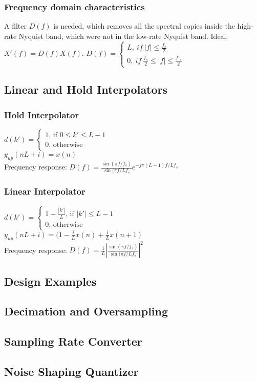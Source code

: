 \subsubsection{Frequency domain characteristics}
A filter $D(f)$ is needed, which removes all the spectral copies inside the high-rate Nyquist band, which were not in the low-rate Nyquist band. Ideal: $X'(f) = D(f)X(f)$.
$D(f)=\begin{cases} L,\ if\ |f|\leq\frac{f_s}{2}\\
0,\ if\ \frac{f_s}{2}\leq |f|\leq\frac{f'_s}{2}
\end{cases}$

\subsection{Linear and Hold Interpolators}
\subsubsection{Hold Interpolator}
$d(k')=\begin{cases}
1\text{, if }0\leq k' \leq L -1\\
0\text{, otherwise}\end{cases}$\\
$y_{up}(nL+i)=x(n)$\\
Frequency response: $D(f)=\frac{\sin(\pi f/f_s)}{\sin(\pi f/Lf_s}e^{-j\pi(L-1)f/Lf_s}$
\subsubsection{Linear Interpolator}
$d(k')=\begin{cases}
1-\frac{|k'|}{L}\text{, if }|k'|\leq L -1\\
0\text{, otherwise}\end{cases}$\\
$y_{up}(nL+i)=(1-\frac{i}{L}x(n)+\frac{i}{L}x(n+1)$\\
Frequency response: $D(f)=\frac{1}{L}\left|\frac{\sin(\pi f/f_s)}{\sin(\pi f/Lf_s}\right|^2$
\subsection{Design Examples}
\subsection{Decimation and Oversampling}
\subsection{Sampling Rate Converter}
\subsection{Noise Shaping Quantizer}
